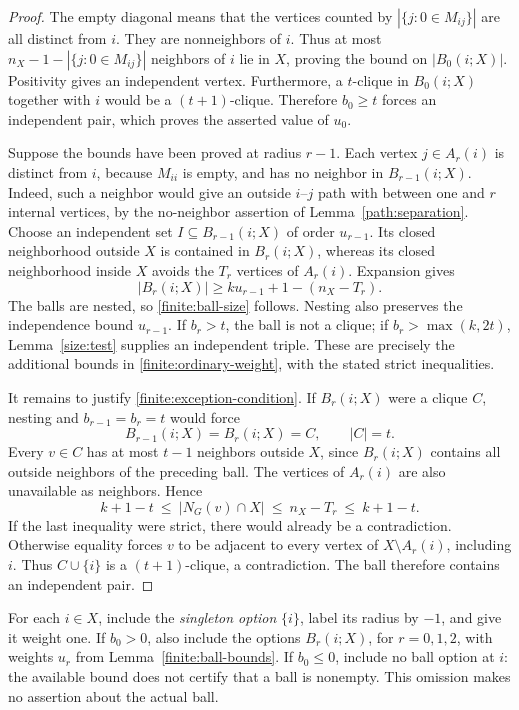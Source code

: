 \begin{proof}
The empty diagonal means that the vertices counted by
$|\{j:0\in M_{ij}\}|$ are all distinct from $i$.  They are nonneighbors
of $i$.  Thus at most
$n_X-1-|\{j:0\in M_{ij}\}|$ neighbors of $i$ lie in $X$, proving the
bound on $|B_0(i;X)|$.  Positivity gives an independent vertex.
Furthermore, a $t$-clique in $B_0(i;X)$ together with $i$ would be a
$(t+1)$-clique.  Therefore $b_0\ge t$ forces an independent pair, which
proves the asserted value of $u_0$.

Suppose the bounds have been proved at radius $r-1$.  Each vertex
$j\in A_r(i)$ is distinct from $i$, because $M_{ii}$ is empty, and has
no neighbor in $B_{r-1}(i;X)$.  Indeed, such a neighbor would give an
outside $i$--$j$ path with between one and $r$ internal vertices, by
the no-neighbor assertion of Lemma~\ref{path:separation}.
Choose an independent set $I\subseteq B_{r-1}(i;X)$ of order
$u_{r-1}$.  Its closed neighborhood outside $X$ is contained in
$B_r(i;X)$, whereas its closed neighborhood inside $X$ avoids the
$T_r$ vertices of $A_r(i)$.  Expansion gives
\[
 |B_r(i;X)|\ge ku_{r-1}+1-(n_X-T_r).
\]
The balls are nested, so \eqref{finite:ball-size} follows.
Nesting also preserves the independence bound $u_{r-1}$.
If $b_r>t$, the ball is not a clique; if $b_r>\max(k,2t)$,
Lemma~\ref{size:test} supplies an independent triple.
These are precisely the additional bounds in
\eqref{finite:ordinary-weight}, with the stated strict inequalities.

It remains to justify \eqref{finite:exception-condition}.
If $B_r(i;X)$ were a clique $C$, nesting and
$b_{r-1}=b_r=t$ would force
\[
 B_{r-1}(i;X)=B_r(i;X)=C,\qquad |C|=t.
\]
Every $v\in C$ has at most $t-1$ neighbors outside $X$, since
$B_r(i;X)$ contains all outside neighbors of the preceding ball.
The vertices of $A_r(i)$ are also unavailable as neighbors.  Hence
\[
 k+1-t
 \ \le\ |N_G(v)\cap X|
 \ \le\ n_X-T_r
 \ \le\ k+1-t.
\]
If the last inequality were strict, there would already be a
contradiction.  Otherwise equality forces $v$ to be adjacent to every
vertex of $X\setminus A_r(i)$, including $i$.
Thus $C\cup\{i\}$ is a $(t+1)$-clique, a contradiction.
The ball therefore contains an independent pair.
\end{proof}

For each $i\in X$, include the \emph{singleton option} $\{i\}$, label its
radius by $-1$, and give it weight one.  If $b_0>0$, also include the
options $B_r(i;X)$, for $r=0,1,2$, with weights $u_r$ from
Lemma~\ref{finite:ball-bounds}.  If $b_0\le0$, include no ball option at
$i$: the available bound does not certify that a ball is nonempty.
This omission makes no assertion about the actual ball.

